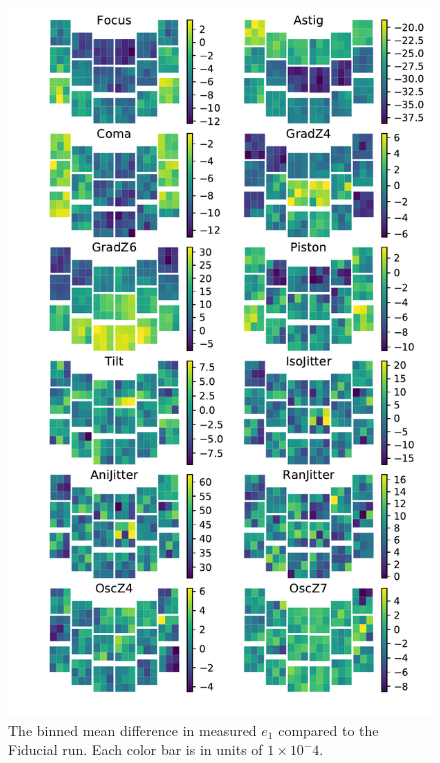 \documentclass[aps,prd, amsmath,amssymb,superscriptaddress,showkeys,nofootinbib,reprint,preprintnumbers]{revtex4-1}
\begin{document}
\begin{figure}
\begin{center}
\includegraphics[width=\columnwidth]{figures/focal_mean_e1.pdf}
\end{center}
\caption[]{
The binned mean difference in measured $e_1$ compared to the Fiducial run. Each color bar is in units of $1\times 10^-4$.
\label{fig:focal_mean_e1}}
\end{figure}
\end{document}
